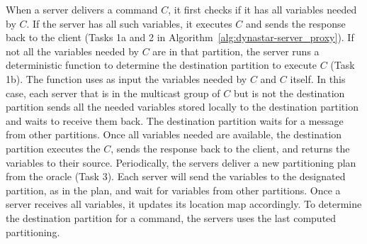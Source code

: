 When a server delivers a command $C$, it first checks if it has all variables
needed by $C$. If the server has all such variables, it executes $C$ and sends
the response back to the client (Tasks 1a and 2 in
Algorithm~\ref{alg:dynastar-server_proxy}). If not all the variables needed by $C$ are in
that partition, the server runs a deterministic function to determine the
destination partition to execute $C$ (Task 1b). The function uses as input the
variables needed by $C$ and $C$ itself. In this case, each server that is in the
multicast group of $C$ but is not the destination partition sends all the needed
variables stored locally to the destination partition and waits to receive them
back. The destination partition waits for a message from other partitions. Once
all variables needed are available, the destination partition executes the $C$,
sends the response back to the client, and returns the variables to their
source. Periodically, the servers deliver a new partitioning plan from the
oracle (Task 3). Each server will send the variables to the designated
partition, as in the plan, and wait for variables from other partitions. Once a
server receives all variables, it updates its location map accordingly.
To determine the destination partition for a command, the servers uses the last
computed partitioning.

